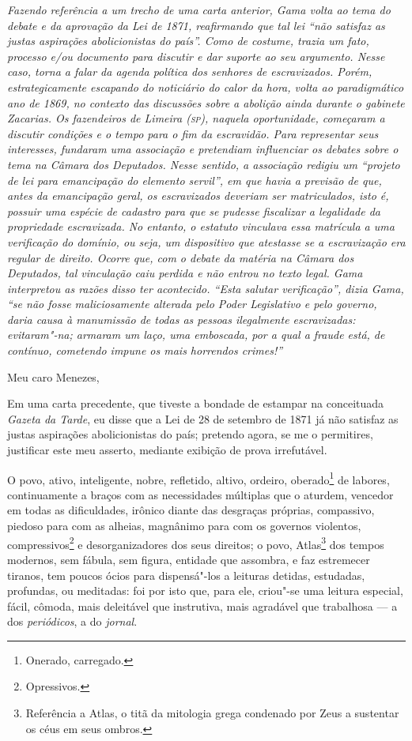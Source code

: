 \begin{flushleft}
{\footnotesize\itshape
Fazendo referência a um trecho de uma carta anterior, Gama volta
ao tema do debate e da aprovação da Lei de 1871, reafirmando que tal lei
``não satisfaz as justas aspirações abolicionistas do país''. Como de
costume, trazia um fato, processo e/ou documento para discutir e dar
suporte ao seu argumento. Nesse caso, torna a falar da agenda política
dos senhores de escravizados. Porém, estrategicamente escapando do
noticiário do calor da hora, volta ao paradigmático ano de 1869, no
contexto das discussões sobre a abolição ainda durante o gabinete
Zacarias. Os fazendeiros de Limeira (\textsc{sp}), naquela oportunidade,
começaram a discutir condições e o tempo para o fim da escravidão. Para
representar seus interesses, fundaram uma associação e pretendiam
influenciar os debates sobre o tema na Câmara dos Deputados. Nesse
sentido, a associação redigiu um ``projeto de lei para emancipação do elemento
servil'', em que havia a previsão de que, antes da emancipação geral, os
escravizados deveriam ser matriculados, isto é, possuir uma espécie de
cadastro para que se pudesse fiscalizar a legalidade da propriedade
escravizada. No entanto, o estatuto vinculava essa matrícula a uma
verificação do domínio, ou seja, um dispositivo que atestasse se a
escravização era regular de direito. Ocorre que, com o debate da matéria
na Câmara dos Deputados, tal vinculação caiu perdida e não entrou no
texto legal. Gama interpretou as razões disso ter acontecido. ``Esta
salutar verificação'', dizia Gama, ``se não fosse maliciosamente alterada
pelo Poder Legislativo e pelo governo, daria causa à manumissão de todas
as pessoas ilegalmente escravizadas: evitaram"-na; armaram um laço, uma
emboscada, por a qual a fraude está, de contínuo, cometendo impune os
mais horrendos crimes!'' }
\end{flushleft}

\noindent{}Meu caro Menezes,\smallskip

Em uma carta precedente, que tiveste a bondade de estampar na
conceituada \emph{Gazeta da Tarde}, eu disse que a Lei de 28 de setembro
de 1871 já não satisfaz as justas aspirações abolicionistas do país;
pretendo agora, se me o permitires, justificar este meu asserto,
mediante exibição de prova irrefutável.

O povo, ativo, inteligente, nobre, refletido, altivo, ordeiro,
oberado\footnote{Onerado, carregado.} de labores, continuamente a
braços com as necessidades múltiplas que o aturdem, vencedor em todas as
dificuldades, irônico diante das desgraças próprias, compassivo, piedoso
para com as alheias, magnânimo para com os governos violentos,
compressivos\footnote{Opressivos.} e desorganizadores dos seus
direitos; o povo, Atlas\footnote{Referência a Atlas, o titã da
  mitologia grega condenado por Zeus a sustentar os céus em seus ombros.}
dos tempos modernos, sem fábula, sem figura, entidade que assombra, e
faz estremecer tiranos, tem poucos ócios para dispensá"-los a leituras
detidas, estudadas, profundas, ou meditadas: foi por isto que, para ele,
criou"-se uma leitura especial, fácil, cômoda, mais deleitável que
instrutiva, mais agradável que trabalhosa --- a dos \emph{periódicos},
a do \emph{jornal}.

